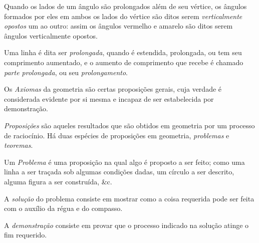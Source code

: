 \documentclass[booklanguage=brazilian]{byrnebook}
\begin{document}
Quando os lados de um ângulo são prolongados além de seu vértice, os ângulos formados por eles em ambos os lados do vértice são ditos serem \emph{verticalmente opostos} um ao outro: assim os ângulos vermelho e amarelo são ditos serem ângulos verticalmente opostos.


Uma linha é dita ser \emph{prolongada}, quando é estendida, prolongada, ou tem seu comprimento aumentado, e o aumento de comprimento que recebe é chamado \emph{parte prolongada}, ou seu \emph{prolongamento}.



Os \emph{Axiomas} da geometria são certas proposições gerais, cuja verdade é considerada evidente por si mesma e incapaz de ser estabelecida por demonstração.

\emph{Proposições} são aqueles resultados que são obtidos em geometria por um processo de raciocínio. Há duas espécies de proposições em geometria, \emph{problemas} e \emph{teoremas}.

Um \emph{Problema} é uma proposição na qual algo é proposto a ser feito; como uma linha a ser traçada sob algumas condições dadas, um círculo a ser descrito, alguma figura a ser construída, \&c.

A \emph{solução} do problema consiste em mostrar como a coisa requerida pode ser feita com o auxílio da régua e do compasso.

A \emph{demonstração} consiste em provar que o processo indicado na solução atinge o fim requerido.
\end{document}
